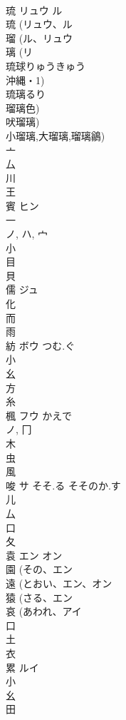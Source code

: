 \documentclass[8pt]{extreport}
\begin{document}
\begin{CJK}{UTF8}{min}
\\	琉	リュウ ル		
\\	琉 (リュウ、ル 
\\	瑠 (ル、リュウ 
\\	璃 (リ 
\\	琉球りゅうきゅう 
\\	沖縄・1) 
\\	琉璃るり 
\\	瑠璃色) 
\\	吠瑠璃) 
\\	小瑠璃,大瑠璃,瑠璃鶲) 
\\	亠 
\\	厶 
\\	川 
\\	王 
\\	賓	ヒン		
\\	一 
\\	ノ, ハ, 宀 
\\	小 
\\	目 
\\	貝 
\\	儒	ジュ		
\\	化 
\\	而 
\\	雨 
\\	紡	ボウ	つむ.ぐ	
\\	小 
\\	幺 
\\	方 
\\	糸 
\\	楓	フウ	かえで	
\\	ノ, 冂 
\\	木 
\\	虫 
\\	風 
\\	唆	サ	そそ.る そそのか.す	
\\	儿 
\\	厶 
\\	口 
\\	夂 
\\	袁	エン オン		
\\	園 (その、エン 
\\	遠 (とおい、エン、オン 
\\	猿 (さる、エン 
\\	哀 (あわれ、アイ 
\\	口 
\\	土 
\\	衣 
\\	累	ルイ		
\\	小 
\\	幺 
\\	田 

\end{CJK}
\end{document}
